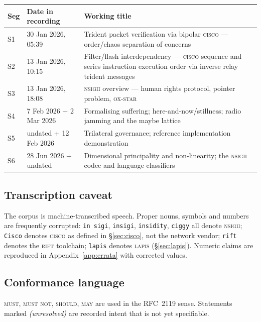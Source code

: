 \documentclass[11pt,a4paper]{article}
\newcommand{\MUST}{\textsc{must}}
\newcommand{\MUSTNOT}{\textsc{must not}}
\newcommand{\SHOULD}{\textsc{should}}
\newcommand{\MAY}{\textsc{may}}
\newcommand{\NSIGII}{\textsc{nsigii}}
\newcommand{\CISCO}{\textsc{cisco}}
\newcommand{\LAPIS}{\textsc{lapis}}
\begin{document}
\begin{center}
\begin{tabular}{@{}llp{8.4cm}@{}}
\toprule
\textbf{Seg} & \textbf{Date in recording} & \textbf{Working title} \\
\midrule
S1 & 30 Jan 2026, 05:39 & Trident packet verification via bipolar \CISCO{} --- order/chaos separation of concerns \\
S2 & 13 Jan 2026, 10:15 & Filter/flash interdependency --- \CISCO{} sequence and series instruction execution order via inverse relay trident messages \\
S3 & 13 Jan 2026, 18:08 & \NSIGII{} overview --- human rights protocol, pointer problem, \textsc{ox-star} \\
S4 & 7 Feb 2026 + 2 Mar 2026 & Formalising suffering; here-and-now/stillness; radio jamming and the maybe lattice \\
S5 & undated + 12 Feb 2026 & Trilateral governance; reference implementation demonstration \\
S6 & 28 Jun 2026 + undated & Dimensional principality and non-linearity; the \NSIGII{} codec and language classifiers \\
\bottomrule
\end{tabular}
\end{center}

\subsection{Transcription caveat}

The corpus is machine-transcribed speech. Proper nouns, symbols and numbers are
frequently corrupted: \texttt{in sigi}, \texttt{insigi}, \texttt{insidity},
\texttt{ciggy} all denote \NSIGII{}; \texttt{Cisco} denotes \CISCO{} as defined
in \S\ref{sec:cisco}, not the network vendor; \texttt{rift} denotes the
\textsc{rift} toolchain; \texttt{lapis} denotes \LAPIS{}
(\S\ref{sec:lapis}). Numeric claims are reproduced in
Appendix~\ref{app:errata} with corrected values.

\subsection{Conformance language}

\MUST{}, \MUSTNOT{}, \SHOULD{}, \MAY{} are used in the RFC~2119 sense.
Statements marked \emph{(unresolved)} are recorded intent that is not yet
specifiable.

\end{document}
